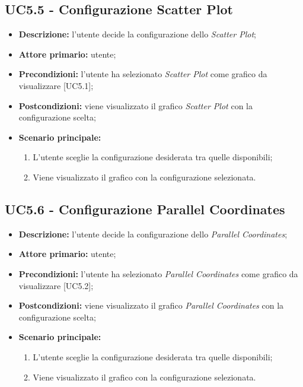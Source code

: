\subsection{UC5.5 - Configurazione Scatter Plot}
\begin{itemize}
    \item \textbf{Descrizione:} l'utente decide la configurazione dello \textit{Scatter Plot};
    \item \textbf{Attore primario:} utente;
    \item \textbf{Precondizioni:} l'utente ha selezionato \textit{Scatter Plot} come grafico da visualizzare [UC5.1];
    \item \textbf{Postcondizioni:} viene visualizzato il grafico \textit{Scatter Plot} con la configurazione scelta;
    \item \textbf{Scenario principale:}
    \begin{enumerate}
      \item L'utente sceglie la configurazione desiderata tra quelle disponibili;
      \item Viene visualizzato il grafico con la configurazione selezionata.
    \end{enumerate}
\end{itemize}

\subsection{UC5.6 - Configurazione Parallel Coordinates}
\begin{itemize}
    \item \textbf{Descrizione:} l'utente decide la configurazione dello \textit{Parallel Coordinates};
    \item \textbf{Attore primario:} utente;
    \item \textbf{Precondizioni:} l'utente ha selezionato \textit{Parallel Coordinates} come grafico da visualizzare [UC5.2];
    \item \textbf{Postcondizioni:} viene visualizzato il grafico \textit{Parallel Coordinates} con la configurazione scelta;
    \item \textbf{Scenario principale:}
    \begin{enumerate}
      \item L'utente sceglie la configurazione desiderata tra quelle disponibili;
      \item Viene visualizzato il grafico con la configurazione selezionata.
    \end{enumerate}
\end{itemize}

